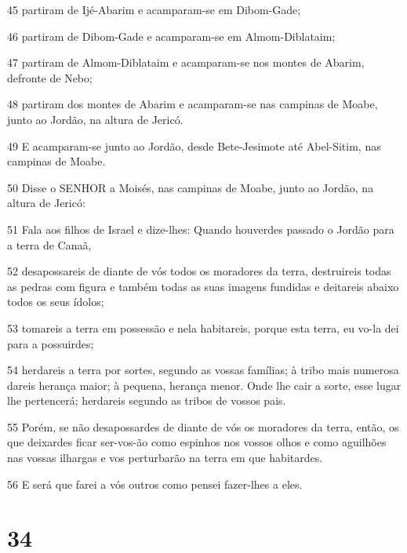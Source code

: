 \par 45 partiram de Ijé-Abarim e acamparam-se em Dibom-Gade;
\par 46 partiram de Dibom-Gade e acamparam-se em Almom-Diblataim;
\par 47 partiram de Almom-Diblataim e acamparam-se nos montes de Abarim, defronte de Nebo;
\par 48 partiram dos montes de Abarim e acamparam-se nas campinas de Moabe, junto ao Jordão, na altura de Jericó.
\par 49 E acamparam-se junto ao Jordão, desde Bete-Jesimote até Abel-Sitim, nas campinas de Moabe.
\par 50 Disse o SENHOR a Moisés, nas campinas de Moabe, junto ao Jordão, na altura de Jericó:
\par 51 Fala aos filhos de Israel e dize-lhes: Quando houverdes passado o Jordão para a terra de Canaã,
\par 52 desapossareis de diante de vós todos os moradores da terra, destruireis todas as pedras com figura e também todas as suas imagens fundidas e deitareis abaixo todos os seus ídolos;
\par 53 tomareis a terra em possessão e nela habitareis, porque esta terra, eu vo-la dei para a possuirdes;
\par 54 herdareis a terra por sortes, segundo as vossas famílias; à tribo mais numerosa dareis herança maior; à pequena, herança menor. Onde lhe cair a sorte, esse lugar lhe pertencerá; herdareis segundo as tribos de vossos pais.
\par 55 Porém, se não desapossardes de diante de vós os moradores da terra, então, os que deixardes ficar ser-vos-ão como espinhos nos vossos olhos e como aguilhões nas vossas ilhargas e vos perturbarão na terra em que habitardes.
\par 56 E será que farei a vós outros como pensei fazer-lhes a eles.

\chapter{34}

